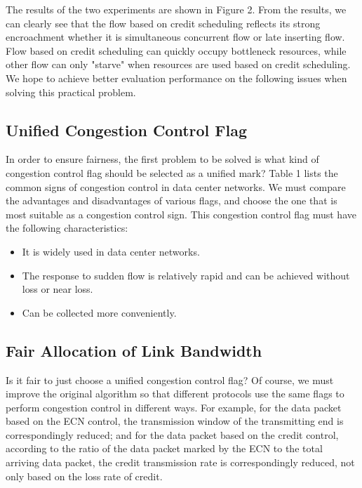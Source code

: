 \documentclass[conference]{IEEEtran}
\begin{document}
\indent The results of the two experiments are shown in Figure 2. From the results, we can clearly see that the flow based on credit scheduling reflects its strong encroachment whether it is simultaneous concurrent flow or late inserting flow. Flow based on credit scheduling can quickly occupy bottleneck resources, while other flow can only "starve" when resources are used based on credit scheduling. We hope to achieve better evaluation performance on the following issues when solving this practical problem.

\subsection{Unified Congestion Control Flag}

In order to ensure fairness, the first problem to be solved is what kind of congestion control flag should be selected as a unified mark? Table 1 lists the common signs of congestion control in data center networks. We must compare the advantages and disadvantages of various flags, and choose the one that is most suitable as a congestion control sign. This congestion control flag must have the following characteristics:
\begin{itemize}
\item It is widely used in data center networks.
\item The response to sudden flow is relatively rapid and can be achieved without loss or near loss.
\item Can be collected more conveniently.
\end{itemize}

\subsection{Fair Allocation of Link Bandwidth}

Is it fair to just choose a unified congestion control flag? Of course, we must improve the original algorithm so that different protocols use the same flags to perform congestion control in different ways. For example, for the data packet based on the ECN control, the transmission window of the transmitting end is correspondingly reduced; and for the data packet based on the credit control, according to the ratio of the data packet marked by the ECN to the total arriving data packet, the credit transmission rate is correspondingly reduced, not only based on the loss rate of credit.
\end{document}
